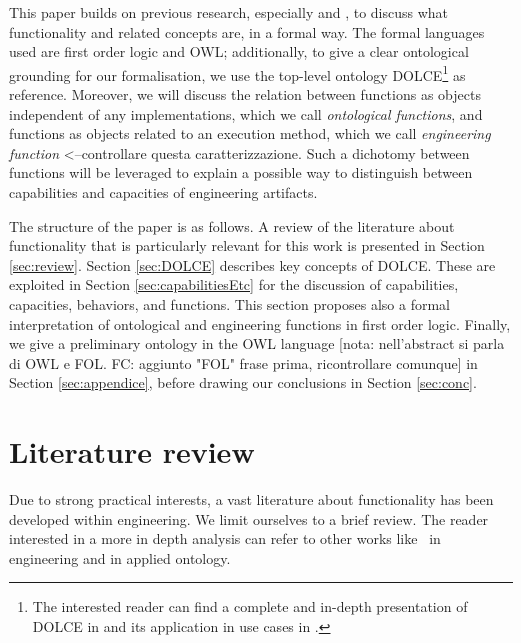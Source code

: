 \documentclass[sw]{iosart2x}
\newcommand{\DOLCE}{\textsc{DOLCE}\xspace} %
\newcommand{\OWL}{\textnormal{OWL}\xspace}
\newcommand{\firstTimeKeyWord}[1]{\textit{#1}}
\newcommand{\TODO}[1]{{\color{red} #1}}
\begin{document}
This paper builds on previous research, especially \cite{borgoCapabilitiesCapacitiesFunctionalities2021} and \cite{mizoguchiUnifyingDefinitionArtifact2016}, to discuss what functionality and related concepts are, in a formal way. 
The formal languages used are first order logic and \OWL; additionally, to give a clear ontological grounding for our formalisation, we use the top-level ontology \DOLCE\footnote{The interested reader can find a complete and in-depth presentation of \DOLCE in \cite{masoloWonderWebDeliverableD182003} and its application in use cases in \cite{borgoDOLCEDescriptiveOntology2022}.} as reference. 
Moreover, we will discuss the relation between functions as objects independent of any implementations, which we call \firstTimeKeyWord{ontological functions}, and functions as objects related to an execution method, which we call \firstTimeKeyWord{engineering function}\TODO{<--controllare questa caratterizzazione}.
Such a dichotomy between functions will be leveraged to explain a possible way to distinguish between capabilities and capacities of engineering artifacts.   

The structure of the paper is as follows. A review of the literature about functionality that is particularly relevant for this work is presented in Section \ref{sec:review}. 
Section \ref{sec:DOLCE} describes key concepts of \DOLCE. These are exploited in Section \ref{sec:capabilitiesEtc} for the discussion of capabilities, capacities, behaviors, and functions. This section proposes also a formal interpretation of ontological and engineering functions in first order logic. 
Finally, we give a preliminary ontology in the \OWL language\TODO{[nota: nell'abstract si parla di OWL e FOL. FC: aggiunto "FOL" frase prima, ricontrollare comunque]} in Section \ref{sec:appendice}, before drawing our conclusions in Section \ref{sec:conc}. 

\section{Literature review\label{sec:review}}%
Due to strong practical interests, a vast literature about functionality has been developed within engineering. 
We limit ourselves to a brief review. The reader interested in a more in depth analysis can refer to other works like~\cite{erdenReviewFunctionModeling2008} in engineering and \cite{artigaNewPerspectiveOnFunctions} in applied ontology.
\end{document}
